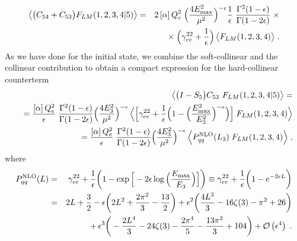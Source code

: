 \documentclass[12pt,a4paper]{article}
\newcommand{\nn}{\nonumber}
\newcommand{\eps}{\epsilon}
\newcommand{\beq}{\begin{eqnarray}}
\newcommand{\eeq}{\end{eqnarray}}
\begin{document}
\beq
\big\langle \big(C_{54}+C_{53}\big) F_{LM}(1,2,3,4|5) \big\rangle
&=&    
2 \, [\alpha]\, Q_e^2 \;
\Big(\frac{4E_{\rm max}^2}{\mu^2} \Big)^{-\eps}
\frac{1}{\eps} \;
\frac{\Gamma^2(1-\eps)}{\Gamma(1-2\eps)} \; \times
\nn \\
&& \times \;
\Big( \gamma_{ee}^{22}
+ \frac{1}{\eps} \Big) \,
\big\langle
F_{LM}(1,2,3,4)
\big\rangle \; .
\eeq
As we have done for the initial state, we combine the soft-collinear and the collinear contribution to obtain a compact expression for the hard-collinear counterterm 
       \beq
&&
\hspace{-20pt}
 \big\langle 
 \big( I- S_5 \big)  C_{53} \
 F_{LM}(1,2,3,4|5) \big\rangle
=
\nn \\
&&
=
\frac{[\alpha]\, Q_e^2}{\eps} \; 
  \frac{\Gamma^2(1-\eps)}{\Gamma(1-2\eps)}
  \Big(\frac{4E_{3}^2}{\mu^2} \Big)^{-\eps} \, 
  \Big\langle
  \Big[
   \gamma_{ee}^{22}
     + \frac{1}{\eps} 
     \Big(
     1
     -
\Big(
\frac{E^2_{\rm max}}{E_3^2} \Big)^{-\eps} 
     \Big)
      \Big] \; 
F_{LM}(1,2,3,4) 
\Big\rangle
\nn \\
&& 
=
\frac{[\alpha]\, Q_e^2}{\eps} \; 
  \frac{\Gamma^2(1-\eps)}{\Gamma(1-2\eps)}
  \Big(\frac{4E_{3}^2}{\mu^2} \Big)^{-\eps} \, 
  \Big\langle
P_{qq}^{\rm NLO}(L_3)\; 
F_{LM}(1,2,3,4) 
\Big\rangle
\; ,
\label{eq:ImS5_C53}
\eeq
where
\beq
P_{qq}^{\rm NLO}(L)
& = &
  \gamma_{ee}^{22}
     + \frac{1}{\eps} 
     \bigg(
     1
     -
     \exp\Big[
     - 2 \eps
     \log
     \Big(
\frac{E_{\rm max}}{E_3} \Big) 
     \Big]
     \bigg)
  \equiv
  \gamma_{ee}^{22}
     + \frac{1}{\eps} 
     \bigg(
     1
     -
    e^{- 2 \eps L}
      \bigg) 
      \nn \\
      &=&
2 L+\frac{3}{2}
- \eps \bigg( 2 L^2+\frac{2 \pi ^2}{3}-\frac{13}{2}\bigg)
   +\epsilon ^2 \bigg(\frac{4 L^3}{3}-16 \zeta (3)-\pi ^2+26\bigg)
   \nn \\
   &&
  + \, \epsilon ^3
   \bigg(-\frac{2 L^4}{3}-24 \zeta (3)-\frac{2 \pi ^4}{5}-\frac{13 \pi
   ^2}{3}+104\bigg)
   +\mathcal{O}\left(\epsilon ^4\right)
   \label{eq:PqqNLO_fsr}
   \; .
     \eeq
\end{document}

